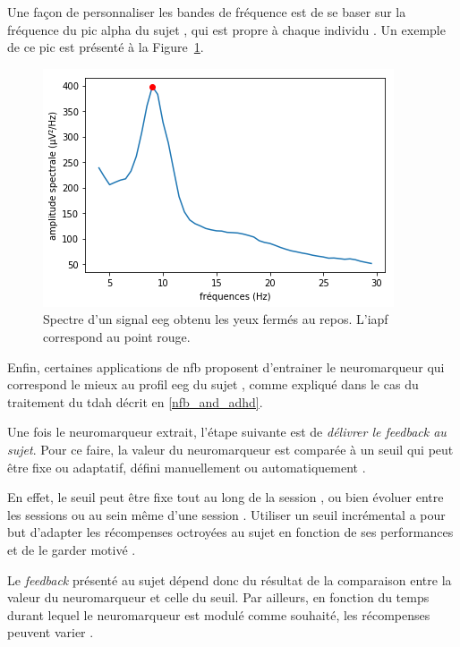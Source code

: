 Une façon de personnaliser les bandes de fréquence est de se baser sur la fréquence du pic alpha du sujet \citep{Alkoby2017, Escolano2014, Bazanova2018, Bioulac2019}, qui 
est propre à chaque individu \citep{Haegens2014, Aurlien2004, Smit2006}. Un exemple de ce pic est présenté à la Figure~\ref{Figure:introduction_iapf}.

\begin{figure}[h!]
  \centering
	\includegraphics[width=0.7\linewidth]{figures/chapter-1/introduction-iapf} 
  \caption{Spectre d'un signal \gls{eeg} obtenu les yeux fermés au repos. L'\gls{iapf} correspond au point rouge.}
  \label{Figure:introduction_iapf}
\end{figure}

Enfin, certaines applications de \gls{nfb} proposent d'entrainer le neuromarqueur qui correspond le mieux au profil \gls{eeg} du sujet 
\citep{Bioulac2019, Kerson2013}, comme expliqué dans le cas du traitement du \gls{tdah} décrit en \ref{nfb_and_adhd}. 

Une fois le neuromarqueur extrait, l'étape suivante est de \emph{délivrer le feedback au sujet}. Pour ce faire, la valeur du neuromarqueur est comparée à un seuil
qui peut être fixe ou adaptatif, défini manuellement ou automatiquement \citep{Arns2014}.

En effet, le seuil peut être fixe tout au long de la session \citep{Kropotov2005, Monastra2002}, ou bien évoluer entre les sessions ou au sein même d'une session \citep{ 
Christiansen2014}. Utiliser un seuil incrémental a pour but d'adapter les récompenses octroyées au sujet en fonction de ses performances et 
de le garder motivé \citep{Bauer2016, Lansbergen2011}. 

Le \textit{feedback} présenté au sujet dépend donc du résultat de la comparaison entre la valeur du neuromarqueur et celle du seuil. Par ailleurs, en fonction du temps durant lequel
le neuromarqueur est modulé comme souhaité, les récompenses peuvent varier \citep{Bioulac2019}. 

